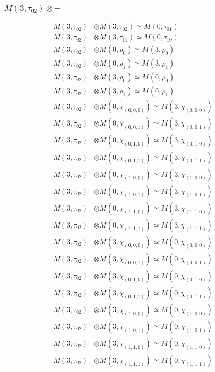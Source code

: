 \subsubsection{$ M(3,\tau_{02})\otimes -$}
\begin{align*}
M(3,\tau_{02}) &\otimes M(3,\tau_{02}) \simeq M(0,\tau_{01}) \\
M(3,\tau_{02}) &\otimes M(3,\tau_{11}) \simeq M(0,\tau_{10}) \\
M(3,\tau_{02}) &\otimes M(0,\rho_{0}) \simeq M(3,\rho_{0}) \\
M(3,\tau_{02}) &\otimes M(0,\rho_{1}) \simeq M(3,\rho_{1}) \\
M(3,\tau_{02}) &\otimes M(3,\rho_{0}) \simeq M(0,\rho_{0}) \\
M(3,\tau_{02}) &\otimes M(3,\rho_{1}) \simeq M(0,\rho_{1}) \\
M(3,\tau_{02}) &\otimes M(0,\chi_{(0,0,0)}) \simeq M(3,\chi_{(0,0,0)}) \\
M(3,\tau_{02}) &\otimes M(0,\chi_{(0,0,1)}) \simeq M(3,\chi_{(0,0,1)}) \\
M(3,\tau_{02}) &\otimes M(0,\chi_{(0,1,0)}) \simeq M(3,\chi_{(0,1,0)}) \\
M(3,\tau_{02}) &\otimes M(0,\chi_{(0,1,1)}) \simeq M(3,\chi_{(0,1,1)}) \\
M(3,\tau_{02}) &\otimes M(0,\chi_{(1,0,0)}) \simeq M(3,\chi_{(1,0,0)}) \\
M(3,\tau_{02}) &\otimes M(0,\chi_{(1,0,1)}) \simeq M(3,\chi_{(1,0,1)}) \\
M(3,\tau_{02}) &\otimes M(0,\chi_{(1,1,0)}) \simeq M(3,\chi_{(1,1,0)}) \\
M(3,\tau_{02}) &\otimes M(0,\chi_{(1,1,1)}) \simeq M(3,\chi_{(1,1,1)}) \\
M(3,\tau_{02}) &\otimes M(3,\chi_{(0,0,0)}) \simeq M(0,\chi_{(0,0,0)}) \\
M(3,\tau_{02}) &\otimes M(3,\chi_{(0,0,1)}) \simeq M(0,\chi_{(0,0,1)}) \\
M(3,\tau_{02}) &\otimes M(3,\chi_{(0,1,0)}) \simeq M(0,\chi_{(0,1,0)}) \\
M(3,\tau_{02}) &\otimes M(3,\chi_{(0,1,1)}) \simeq M(0,\chi_{(0,1,1)}) \\
M(3,\tau_{02}) &\otimes M(3,\chi_{(1,0,0)}) \simeq M(0,\chi_{(1,0,0)}) \\
M(3,\tau_{02}) &\otimes M(3,\chi_{(1,0,1)}) \simeq M(0,\chi_{(1,0,1)}) \\
M(3,\tau_{02}) &\otimes M(3,\chi_{(1,1,0)}) \simeq M(0,\chi_{(1,1,0)}) \\
M(3,\tau_{02}) &\otimes M(3,\chi_{(1,1,1)}) \simeq M(0,\chi_{(1,1,1)}) \\

\end{align*}
